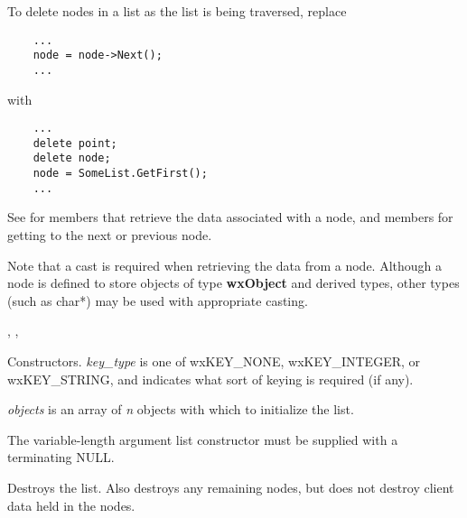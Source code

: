To delete nodes in a list as the list is being traversed, replace

\begin{verbatim}
    ...
    node = node->Next();
    ...
\end{verbatim}

with

\begin{verbatim}
    ...
    delete point;
    delete node;
    node = SomeList.GetFirst();
    ...
\end{verbatim}

See  for members that retrieve the data associated with a node, and
members for getting to the next or previous node.

Note that a cast is required when retrieving the data from a node.  Although a
node is defined to store objects of type {\bf wxObject} and derived types, other
types (such as char*) may be used with appropriate casting.


, ,







Constructors. {\it key\_type} is one of wxKEY\_NONE, wxKEY\_INTEGER, or wxKEY\_STRING,
and indicates what sort of keying is required (if any).

{\it objects} is an array of {\it n} objects with which to initialize the list.

The variable-length argument list constructor must be supplied with a
terminating NULL.



Destroys the list.  Also destroys any remaining nodes, but does not destroy
client data held in the nodes.



